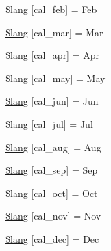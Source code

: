 \begin{DoxyCompactItemize}
\item 
\mbox{\hyperlink{calendar__lang_8php_a2ac2b36f9c74b0d8e16037917fba7329}{\$lang}} \mbox{[}\textquotesingle{}cal\+\_\+feb\textquotesingle{}\mbox{]} = \textquotesingle{}Feb\textquotesingle{}
\item 
\mbox{\hyperlink{calendar__lang_8php_a42faa7b43903567bf28b50438b73f028}{\$lang}} \mbox{[}\textquotesingle{}cal\+\_\+mar\textquotesingle{}\mbox{]} = \textquotesingle{}Mar\textquotesingle{}
\item 
\mbox{\hyperlink{calendar__lang_8php_a257b49a3fb1c97fa61ad6b119830fd01}{\$lang}} \mbox{[}\textquotesingle{}cal\+\_\+apr\textquotesingle{}\mbox{]} = \textquotesingle{}Apr\textquotesingle{}
\item 
\mbox{\hyperlink{calendar__lang_8php_a2fe441f6a73f54209e7a06e04708ea48}{\$lang}} \mbox{[}\textquotesingle{}cal\+\_\+may\textquotesingle{}\mbox{]} = \textquotesingle{}May\textquotesingle{}
\item 
\mbox{\hyperlink{calendar__lang_8php_abb9cf27951ae82a0af7ab9ba0da03e3c}{\$lang}} \mbox{[}\textquotesingle{}cal\+\_\+jun\textquotesingle{}\mbox{]} = \textquotesingle{}Jun\textquotesingle{}
\item 
\mbox{\hyperlink{calendar__lang_8php_a949118eb45a5cfb893fbab8ad8ecde58}{\$lang}} \mbox{[}\textquotesingle{}cal\+\_\+jul\textquotesingle{}\mbox{]} = \textquotesingle{}Jul\textquotesingle{}
\item 
\mbox{\hyperlink{calendar__lang_8php_a716da1850b29b39798daccda0479fa57}{\$lang}} \mbox{[}\textquotesingle{}cal\+\_\+aug\textquotesingle{}\mbox{]} = \textquotesingle{}Aug\textquotesingle{}
\item 
\mbox{\hyperlink{calendar__lang_8php_ad710a9d122c0a4c5c1f40bb817c0fdaa}{\$lang}} \mbox{[}\textquotesingle{}cal\+\_\+sep\textquotesingle{}\mbox{]} = \textquotesingle{}Sep\textquotesingle{}
\item 
\mbox{\hyperlink{calendar__lang_8php_a10ed86cce085eaaf616b802870b7fadf}{\$lang}} \mbox{[}\textquotesingle{}cal\+\_\+oct\textquotesingle{}\mbox{]} = \textquotesingle{}Oct\textquotesingle{}
\item 
\mbox{\hyperlink{calendar__lang_8php_ae8dbd54567f9ed82df3078b50b3ed71e}{\$lang}} \mbox{[}\textquotesingle{}cal\+\_\+nov\textquotesingle{}\mbox{]} = \textquotesingle{}Nov\textquotesingle{}
\item 
\mbox{\hyperlink{calendar__lang_8php_a0d70b452fc659e14baa3db6bbea3e199}{\$lang}} \mbox{[}\textquotesingle{}cal\+\_\+dec\textquotesingle{}\mbox{]} = \textquotesingle{}Dec\textquotesingle{}
\item 

\end{DoxyCompactItemize}
